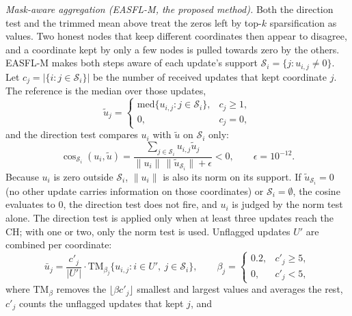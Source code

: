 \textit{Mask-aware aggregation (EASFL-M, the proposed method).} Both the direction test
and the trimmed mean above treat the zeros left by top-$k$ sparsification as values. Two
honest nodes that keep different coordinates then appear to disagree, and a coordinate
kept by only a few nodes is pulled towards zero by the others. EASFL-M makes both steps
aware of each update's support $\mathcal{S}_i=\{j:u_{i,j}\neq0\}$. Let
$c_j=|\{i:j\in\mathcal{S}_i\}|$ be the number of received updates that kept coordinate $j$.
The reference is the median over those updates,
\begin{equation}
\tilde u_j=\begin{cases}\mathrm{med}\{u_{i,j}:j\in\mathcal{S}_i\}, & c_j\ge1,\\ 0, & c_j=0,\end{cases}
\end{equation}
and the direction test compares $u_i$ with $\tilde u$ on $\mathcal{S}_i$ only:
\begin{equation}
\cos_{\mathcal{S}_i}(u_i,\tilde u)=\frac{\sum_{j\in\mathcal{S}_i}u_{i,j}\tilde u_j}
{\|u_i\|\,\|\tilde u_{\mathcal{S}_i}\|+\epsilon}<0,\qquad \epsilon=10^{-12}.
\end{equation}
Because $u_i$ is zero outside $\mathcal{S}_i$, $\|u_i\|$ is also its norm on its support.
If $\tilde u_{\mathcal{S}_i}=0$ (no other update carries information on those
coordinates) or $\mathcal{S}_i=\emptyset$, the cosine evaluates to 0, the direction test
does not fire, and $u_i$ is judged by the norm test alone. The direction test is applied
only when at least three updates reach the CH; with one or two, only the norm test is
used. Unflagged updates $U'$ are combined per coordinate:
\begin{equation}
\bar u_j=\frac{c'_j}{|U'|}\cdot\mathrm{TM}_{\beta_j}\{u_{i,j}: i\in U',\ j\in\mathcal{S}_i\},
\qquad \beta_j=\begin{cases}0.2, & c'_j\ge5,\\0, & c'_j<5,\end{cases}
\end{equation}
where $\mathrm{TM}_\beta$ removes the $\lfloor\beta c'_j\rfloor$ smallest and largest values
and averages the rest, $c'_j$ counts the unflagged updates that kept $j$, and
